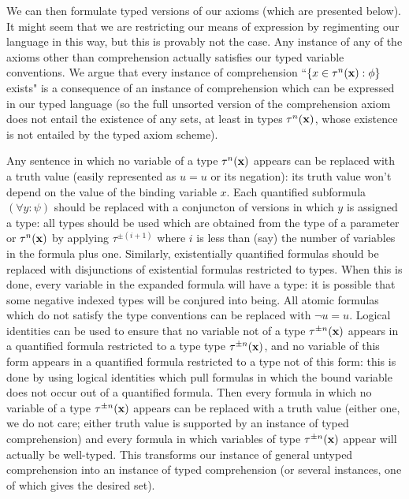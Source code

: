 \documentclass[12pt]{book}
\begin{document}
We can then formulate typed versions of our axioms (which are presented below).  It might seem that we are restricting our means of expression by regimenting our
language in this way, but this is provably not the case.  Any instance of any of the axioms other than comprehension actually satisfies our typed variable conventions.
We argue that every instance of comprehension ``$\{x \in \tau^n({\bf x}):\phi\}$ exists" is a consequence of an instance of comprehension which can be expressed in our typed
language (so the full unsorted version of the comprehension axiom does not entail the existence of any sets, at least in types $\tau^n({\bf x})$, whose existence is not entailed by the typed axiom scheme).

Any sentence in which no variable of a type $\tau^n({\bf x})$ appears can be replaced with a truth value (easily represented as $u=u$ or its negation):  its truth value won't
depend on the value of the binding variable $x$.  Each quantified subformula $(\forall y:\psi)$ should be replaced with a conjuncton of versions in which $y$ is assigned a type:  all types should be used which are obtained from the type of a parameter or $\tau^n({\bf x})$ by applying $\tau^{\pm(i+1)}$ where $i$ is less than (say) the number of variables in the formula plus one.  Similarly, existentially quantified formulas should be replaced with disjunctions of  existential formulas restricted to types.  When this is done, every variable in the expanded formula will have a type:  it is possible that some negative indexed types will be conjured into being.  All atomic formulas which do not satisfy the type conventions can be replaced with $\neg u=u$.
Logical identities can be used to ensure that no variable not of a type $\tau^{\pm n}({\bf x})$ appears in a quantified formula restricted to a type  type $\tau^{\pm n}({\bf x})$,
and no variable of this form appears in a quantified formula restricted to a type not of this form:  this is done by using logical identities which pull formulas in which the bound variable does not occur out of a quantified formula.  Then every formula in which  no variable of a type $\tau^{\pm n}({\bf x})$ appears can be replaced with a truth value (either one, we do not care;
either truth value is supported by an instance of typed comprehension) and every formula in which variables of  type $\tau^{\pm n}({\bf x})$ appear will actually be well-typed.  This transforms our instance of general untyped comprehension into an instance of typed comprehension (or several instances, one of which gives the desired set).
\end{document}
